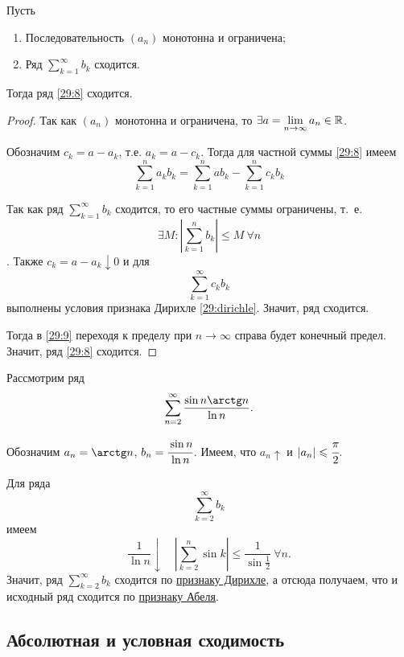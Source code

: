 \documentclass[../../main.tex]{subfiles}
\begin{document}
	\begin{thm}
		Пусть
		\begin{enumerate}
			\item Последовательность $(a_n)$ монотонна и ограничена;
			\item Ряд $\sum\limits_{k = 1}^\infty b_k$ сходится.
		\end{enumerate}
	
		Тогда ряд \eqref{29:8} сходится.
	\end{thm}
	\begin{proof}
		Так как $(a_n)$ монотонна и ограничена, то $\exists a = 
		\lim\limits_{n\to\infty} a_n\in \R$.
		
		Обозначим $c_k = a - a_k$, т.е. $a_k = a - c_k$. 
		Тогда для частной суммы \eqref{29:8} имеем
		\begin{equation}
			\sum_{k = 1}^n a_kb_k = \sum_{k = 1}^n ab_k - \sum_{k = 1}^n c_kb_k
			\label{29:9}
		\end{equation}
		
		Так как ряд $\sum\limits_{k = 1}^\infty b_k$ сходится, 
		то его частные суммы ограничены, т.~е. 
		\[\exists M\colon \left|\sum\limits_{k = 1}^n b_k\right|\leq M \ 
		\forall n\]. 
		Также $c_k = a - a_k \downarrow 0$ и для 
		\[\sum_{k = 1}^\infty c_kb_k\]
		выполнены условия признака Дирихле \ref{29:dirichle}. 
		Значит, ряд сходится.
		
		Тогда в \eqref{29:9} переходя к пределу при $n\to\infty$ 
		справа будет конечный предел. Значит, ряд \eqref{29:8} сходится.
	\end{proof}
	\begin{example}
		Рассмотрим ряд
		\[\sum_{n = 2}^\infty\frac{\sin n\arctg n}{\ln n}.\]
		
		Обозначим $a_n = \arctg n$, $b_n = \cfrac{\sin n}{\ln n}$. 
		Имеем, что $a_n\uparrow$ и $|a_n|\leq \cfrac{\pi}{2}$.
		
		Для ряда \[\sum_{k = 2}^\infty b_k\] 
		имеем
		\[\frac{1}{\ln n}\downarrow\quad \left|\sum_{k = 2}^n \sin k\right|
		\leq \frac{1}{\sin\frac{1}{2}}\ \forall n.\]
		Значит, ряд $\sum\limits_{k = 2}^\infty b_k$ сходится по 
		\href{29:dirichle}{признаку Дирихле}, а отсюда получаем, 
		что и исходный ряд сходится по \href{29:abel}{признаку Абеля}.
	\end{example}

	\subsection{Абсолютная и условная сходимость}
	
\end{document}
